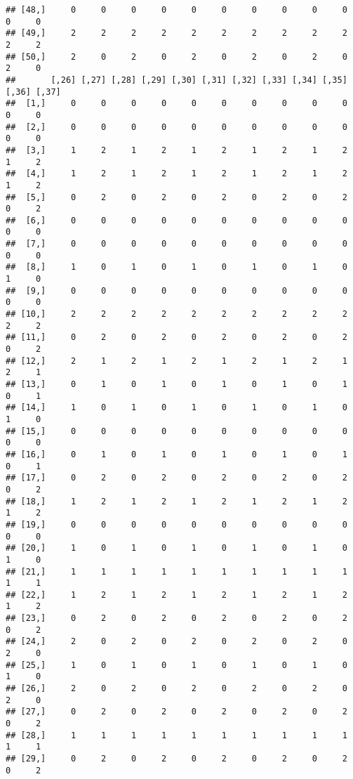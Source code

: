 \documentclass[
]{article}
\begin{document}
\begin{verbatim}
## [48,]     0     0     0     0     0     0     0     0     0     0     0     0
## [49,]     2     2     2     2     2     2     2     2     2     2     2     2
## [50,]     2     0     2     0     2     0     2     0     2     0     2     0
##       [,26] [,27] [,28] [,29] [,30] [,31] [,32] [,33] [,34] [,35] [,36] [,37]
##  [1,]     0     0     0     0     0     0     0     0     0     0     0     0
##  [2,]     0     0     0     0     0     0     0     0     0     0     0     0
##  [3,]     1     2     1     2     1     2     1     2     1     2     1     2
##  [4,]     1     2     1     2     1     2     1     2     1     2     1     2
##  [5,]     0     2     0     2     0     2     0     2     0     2     0     2
##  [6,]     0     0     0     0     0     0     0     0     0     0     0     0
##  [7,]     0     0     0     0     0     0     0     0     0     0     0     0
##  [8,]     1     0     1     0     1     0     1     0     1     0     1     0
##  [9,]     0     0     0     0     0     0     0     0     0     0     0     0
## [10,]     2     2     2     2     2     2     2     2     2     2     2     2
## [11,]     0     2     0     2     0     2     0     2     0     2     0     2
## [12,]     2     1     2     1     2     1     2     1     2     1     2     1
## [13,]     0     1     0     1     0     1     0     1     0     1     0     1
## [14,]     1     0     1     0     1     0     1     0     1     0     1     0
## [15,]     0     0     0     0     0     0     0     0     0     0     0     0
## [16,]     0     1     0     1     0     1     0     1     0     1     0     1
## [17,]     0     2     0     2     0     2     0     2     0     2     0     2
## [18,]     1     2     1     2     1     2     1     2     1     2     1     2
## [19,]     0     0     0     0     0     0     0     0     0     0     0     0
## [20,]     1     0     1     0     1     0     1     0     1     0     1     0
## [21,]     1     1     1     1     1     1     1     1     1     1     1     1
## [22,]     1     2     1     2     1     2     1     2     1     2     1     2
## [23,]     0     2     0     2     0     2     0     2     0     2     0     2
## [24,]     2     0     2     0     2     0     2     0     2     0     2     0
## [25,]     1     0     1     0     1     0     1     0     1     0     1     0
## [26,]     2     0     2     0     2     0     2     0     2     0     2     0
## [27,]     0     2     0     2     0     2     0     2     0     2     0     2
## [28,]     1     1     1     1     1     1     1     1     1     1     1     1
## [29,]     0     2     0     2     0     2     0     2     0     2     0     2

\end{verbatim}
\end{document}
